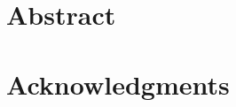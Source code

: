 \documentclass[a4paper,10pt,twoside]{report}
\author{\me}
\begin{document}


\normalsize

\clearemptydoublepage


%

%


\chapter*{Abstract}\label{chapter:abstract}


\clearemptydoublepage
\chapter*{Acknowledgments}\label{chapter:acknowledgment}

\clearemptydoublepage
%



%


\tableofcontents


\listoffigures


\listoftables
{}
\renewcommand{\nomname}{Nomenclature}
\printnomenclature
\end{document}
